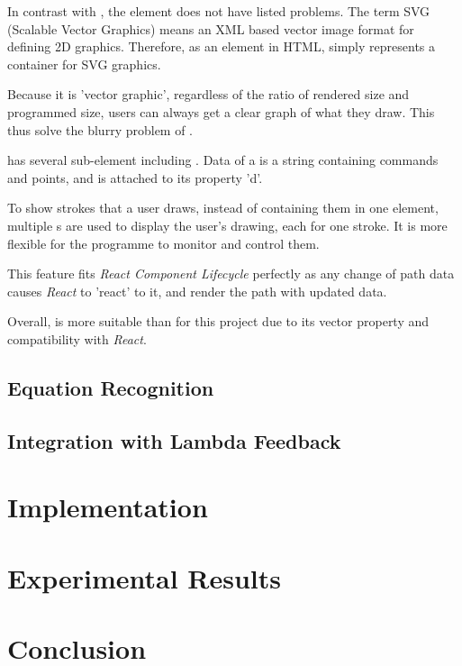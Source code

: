 \documentclass[12pt,twoside]{report}
\begin{document}
In contrast with , the  element does not have listed
problems. The term SVG (Scalable Vector Graphics) means an XML based vector
image format for defining 2D graphics. Therefore, as an element in HTML,
 simply represents a container for SVG graphics.

Because it is 'vector graphic', regardless of the ratio of rendered size and
programmed size, users can always get a clear graph of what they draw. This thus
solve the blurry problem of .

 has several sub-element including . Data of a  is a string containing commands and points, and is attached to its property 'd'. 

To show strokes that a user draws, instead of containing them in one  element, multiple s are used to display the user's drawing, each for one stroke. It is more flexible for the programme to monitor and control them. 

This feature fits \textit{React Component Lifecycle} perfectly as any change of path data causes \textit{React} to 'react' to it, and render the path with updated data.

Overall,  is more suitable than  for this project due to its vector property and compatibility with \textit{React}.



\section{Equation Recognition}
\label{bgEqnRecognition}




\section{Integration with Lambda Feedback}
\label{bgIntegrationLF}



\chapter{Implementation}
\label{Implementation}


\chapter{Experimental Results}
\label{Results}


\chapter{Conclusion}
\label{Conclusion}




\end{document}

